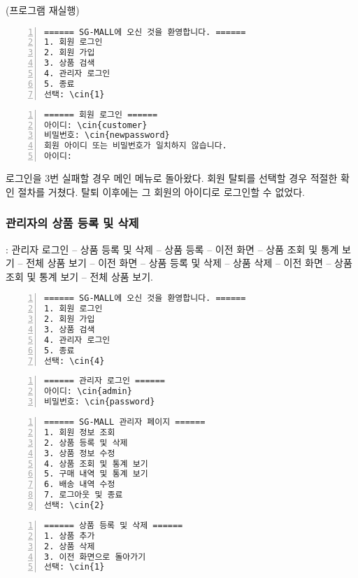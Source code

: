 \documentclass[runningheads]{llncs}
\newcommand{\cin}[1]{\textbf{\textcolor{orange}{#1}}}
\begin{document}
(프로그램 재실행)

\begin{Verbatim}[frame=single,numbers=left,commandchars=\\\{\}]
====== SG-MALL에 오신 것을 환영합니다. ======
1. 회원 로그인
2. 회원 가입
3. 상품 검색
4. 관리자 로그인
5. 종료
선택: \cin{1}
\end{Verbatim}

\begin{Verbatim}[frame=single,numbers=left,commandchars=\\\{\}]
====== 회원 로그인 ======
아이디: \cin{customer}
비밀번호: \cin{newpassword}
회원 아이디 또는 비밀번호가 일치하지 않습니다.
아이디: 
\end{Verbatim}

로그인을 3번 실패할 경우 메인 메뉴로 돌아왔다. 회원 탈퇴를 선택할 경우 적절한 확인 절차를 거쳤다. 탈퇴 이후에는 그 회원의 아이디로 로그인할 수 없었다.

\subsubsection{관리자의 상품 등록 및 삭제}: 관리자 로그인 -- 상품 등록 및 삭제 -- 상품 등록 -- 이전 화면 -- 상품 조회 및 통계 보기 -- 전체 상품 보기 -- 이전 화면 -- 상품 등록 및 삭제 -- 상품 삭제 -- 이전 화면 -- 상품 조회 및 통계 보기 -- 전체 상품 보기.

\begin{Verbatim}[frame=single,numbers=left,commandchars=\\\{\}]
====== SG-MALL에 오신 것을 환영합니다. ======
1. 회원 로그인
2. 회원 가입
3. 상품 검색
4. 관리자 로그인
5. 종료
선택: \cin{4}
\end{Verbatim}

\begin{Verbatim}[frame=single,numbers=left,commandchars=\\\{\}]
====== 관리자 로그인 ======
아이디: \cin{admin}
비밀번호: \cin{password}
\end{Verbatim}

\begin{Verbatim}[frame=single,numbers=left,commandchars=\\\{\}]
====== SG-MALL 관리자 페이지 ======
1. 회원 정보 조회
2. 상품 등록 및 삭제
3. 상품 정보 수정
4. 상품 조회 및 통계 보기
5. 구매 내역 및 통계 보기
6. 배송 내역 수정
7. 로그아웃 및 종료
선택: \cin{2}
\end{Verbatim}

\begin{Verbatim}[frame=single,numbers=left,commandchars=\\\{\}]
====== 상품 등록 및 삭제 ======
1. 상품 추가
2. 상품 삭제
3. 이전 화면으로 돌아가기
선택: \cin{1}
\end{Verbatim}
\end{document}
